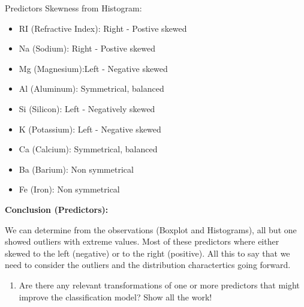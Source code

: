 \documentclass[
  letterpaper,
  DIV=11,
  numbers=noendperiod]{scrartcl}
\providecommand{\tightlist}{%
  \setlength{\itemsep}{0pt}\setlength{\parskip}{0pt}}\usepackage{longtable,booktabs,array}
\begin{document}
Predictors Skewness from Histogram:

\begin{itemize}
\tightlist
\item
  RI (Refractive Index): Right - Postive skewed
\item
  Na (Sodium): Right - Postive skewed
\item
  Mg (Magnesium):Left - Negative skewed
\item
  Al (Aluminum): Symmetrical, balanced
\item
  Si (Silicon): Left - Negatively skewed
\item
  K (Potassium): Left - Negative skewed
\item
  Ca (Calcium): Symmetrical, balanced
\item
  Ba (Barium): Non symmetrical
\item
  Fe (Iron): Non symmetrical
\end{itemize}

\textbf{Conclusion (Predictors):}

We can determine from the observations (Boxplot and Histograms), all but
one showed outliers with extreme values. Most of these predictors where
either skewed to the left (negative) or to the right (positive). All
this to say that we need to consider the outliers and the distribution
charactertics going forward.

\begin{enumerate}
\def\labelenumi{\alph{enumi})}
\setcounter{enumi}{2}
\tightlist
\item
  Are there any relevant transformations of one or more predictors that
  might improve the classification model? Show all the work!
\end{enumerate}
\end{document}
